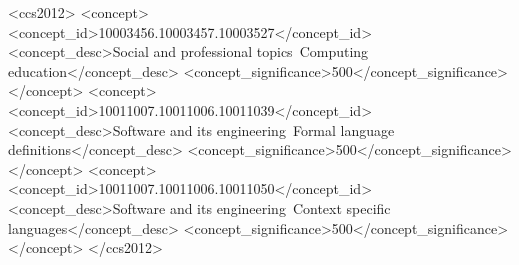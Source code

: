 \documentclass[manuscript,screen,anonymous,review]{acmart}
\begin{document}
\begin{CCSXML}
<ccs2012>
<concept>
<concept_id>10003456.10003457.10003527</concept_id>
<concept_desc>Social and professional topics~Computing education</concept_desc>
<concept_significance>500</concept_significance>
</concept>
<concept>
<concept_id>10011007.10011006.10011039</concept_id>
<concept_desc>Software and its engineering~Formal language definitions</concept_desc>
<concept_significance>500</concept_significance>
</concept>
<concept>
<concept_id>10011007.10011006.10011050</concept_id>
<concept_desc>Software and its engineering~Context specific languages</concept_desc>
<concept_significance>500</concept_significance>
</concept>
</ccs2012>
\end{CCSXML}






\maketitle









\end{document}
